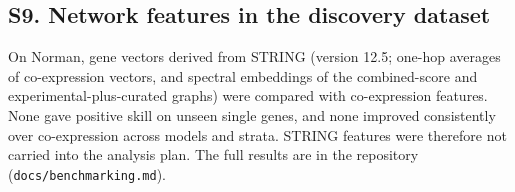 \begin{table}[H]
\centering\scriptsize
\caption{Selection-independent reproducibility analysis. Perturbations were selected using two cell halves within batch set A and scored against the response from batch set B. Models were trained on the primary training targets, which share some control cells with set B; this affects models and the mean baseline alike, but not the zero prediction.}
\label{tab:repind}
\resizebox{\linewidth}{!}{}
\end{table}

\begin{table}[H]
\centering\scriptsize
\caption{Interval coverage on all genes, on the 20 genes with the largest predicted deviation, and on the 20 with the largest observed deviation (selected on the outcome).}
\label{tab:ivsel}

\end{table}

\begin{table}[H]
\centering\scriptsize
\caption{Precision of ranking held-out genes by predicted response magnitude, with 95\% bootstrap intervals and permutation $p$-values against random rankings (2{,}000 permutations).}
\label{tab:ranking}
\resizebox{\linewidth}{!}{}
\end{table}

\subsection*{S9. Network features in the discovery dataset}
On Norman, gene vectors derived from STRING \citep{szklarczyk2023} (version 12.5; one-hop averages of co-expression vectors, and spectral embeddings of the combined-score and experimental-plus-curated graphs) were compared with co-expression features. None gave positive skill on unseen single genes, and none improved consistently over co-expression across models and strata. STRING features were therefore not carried into the analysis plan. The full results are in the repository (\texttt{docs/benchmarking.md}).


